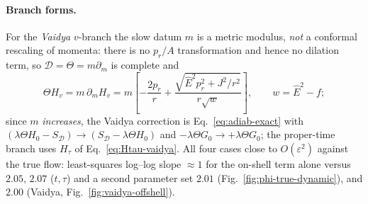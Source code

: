 \documentclass[12pt]{iopart}
\newcommand{\Ehat}{\hat E}
\begin{document}
\paragraph{Branch forms.} For the \emph{Vaidya} $v$-branch the slow datum $m$ is a metric
modulus, \emph{not} a conformal rescaling of momenta: there is no $p_r/A$ transformation
and hence no dilation term, so $\mathcal D=\Theta=m\partial_m$ is complete and
\begin{equation}
    \Theta H_v=m\,\partial_m H_v
    =m\!\left[-\frac{2p_r}{r}+\frac{\sqrt{\Ehat^2p_r^2+J^2/r^2}}{r\sqrt w}\right],
    \qquad w=\Ehat^2-f;
    \label{eq:ThetaHv}
\end{equation}
since $m$ \emph{increases}, the Vaidya correction is Eq.~\eqref{eq:adiab-exact} with
$(\lambda\Theta H_0-S_{\mathcal D})\to(S_{\mathcal D}-\lambda\Theta H_0)$ and
$-\lambda\Theta G_0\to+\lambda\Theta G_0$; the proper-time branch uses $H_\tau$ of
Eq.~\eqref{eq:Htau-vaidya}. All four cases close to $O(\varepsilon^2)$ against the true
flow: least-squares log--log slope $\approx1$ for the on-shell term alone versus
$2.05,\,2.07$ ($t,\tau$) and a second parameter set $2.01$
(Fig.~\ref{fig:phi-true-dynamic}), and $2.00$ (Vaidya, Fig.~\ref{fig:vaidya-offshell}).
\end{document}
